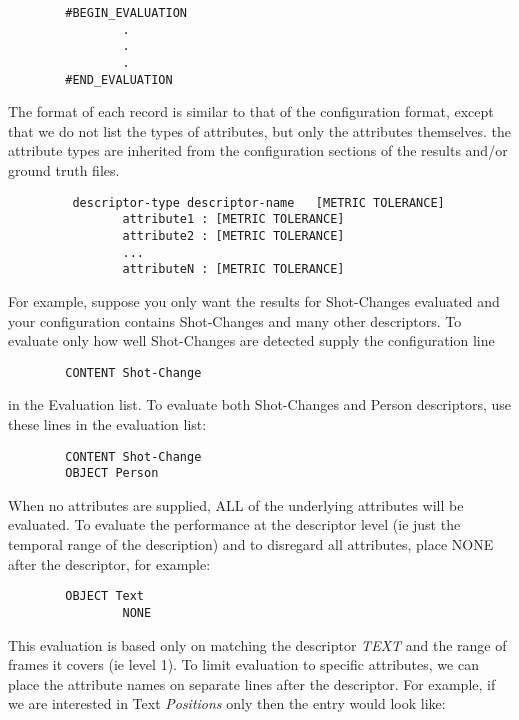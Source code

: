 \begin{verbatim}
        #BEGIN_EVALUATION
                .
                .
                .
        #END_EVALUATION
\end{verbatim}


The format of each record is similar to that of the configuration
format, except that we do not list the types of attributes, but only
the attributes themselves.  the attribute types are inherited from the
configuration sections of the results and/or ground truth files.


\begin{verbatim}
         descriptor-type descriptor-name   [METRIC TOLERANCE]
                attribute1 : [METRIC TOLERANCE]
                attribute2 : [METRIC TOLERANCE]
                ...
                attributeN : [METRIC TOLERANCE]
\end{verbatim}

For example, suppose you only want the
results for Shot-Changes evaluated and your configuration contains
Shot-Changes and many other descriptors.  To evaluate only how well
Shot-Changes are detected supply the configuration line

\begin{verbatim}
        CONTENT Shot-Change
\end{verbatim}

in the Evaluation list. To evaluate  both Shot-Changes and Person descriptors,
use these lines in the evaluation list:

\begin{verbatim}
        CONTENT Shot-Change
        OBJECT Person
\end{verbatim}

When no attributes are supplied, ALL of the underlying attributes will
be evaluated. To evaluate the performance at the descriptor level (ie
just the temporal range of the description) and to disregard all
attributes, place NONE after the descriptor, for example:

\begin{verbatim}
        OBJECT Text
                NONE
\end{verbatim}

This evaluation is based only on matching the descriptor {\em TEXT}
and the range of frames it covers (ie level 1).  To limit evaluation to specific
attributes, we can place the attribute names on separate lines after
the descriptor.  For example, if we are interested in Text {\em
Positions} only then the entry would look like:

